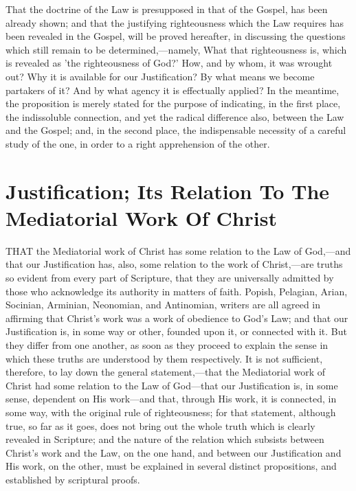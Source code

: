 \documentclass[
]{book}
\begin{document}
That the doctrine of the Law is presupposed in that of the Gospel, has been already shown; and that the justifying righteousness which the Law requires has been revealed in the Gospel, will be proved hereafter, in discussing the questions which still remain to be determined,---namely, What that righteousness is, which is revealed as 'the righteousness of God?' How, and by whom, it was wrought out? Why it is available for our Justification? By what means we become partakers of it? And by what agency it is effectually applied? In the meantime, the proposition is merely stated for the purpose of indicating, in the first place, the indissoluble connection, and yet the radical difference also, between the Law and the Gospel; and, in the second place, the indispensable necessity of a careful study of the one, in order to a right apprehension of the other.

\hypertarget{justification-its-relation-to-the-mediatorial-work-of-christ}{%
\chapter{Justification; Its Relation To The Mediatorial Work Of Christ}\label{justification-its-relation-to-the-mediatorial-work-of-christ}}

THAT the Mediatorial work of Christ has some relation to the Law of God,---and that our Justification has, also, some relation to the work of Christ,---are truths so evident from every part of Scripture, that they are universally admitted by those who acknowledge its authority in matters of faith. Popish, Pelagian, Arian, Socinian, Arminian, Neonomian, and Antinomian, writers are all agreed in affirming that Christ's work was a work of obedience to God's Law; and that our Justification is, in some way or other, founded upon it, or connected with it. But they differ from one another, as soon as they proceed to explain the sense in which these truths are understood by them respectively. It is not sufficient, therefore, to lay down the general statement,---that the Mediatorial work of Christ had some relation to the Law of God---that our Justification is, in some sense, dependent on His work---and that, through His work, it is connected, in some way, with the original rule of righteousness; for that statement, although true, so far as it goes, does not bring out the whole truth which is clearly revealed in Scripture; and the nature of the relation which subsists between Christ's work and the Law, on the one hand, and between our Justification and His work, on the other, must be explained in several distinct propositions, and established by scriptural proofs.
\end{document}
